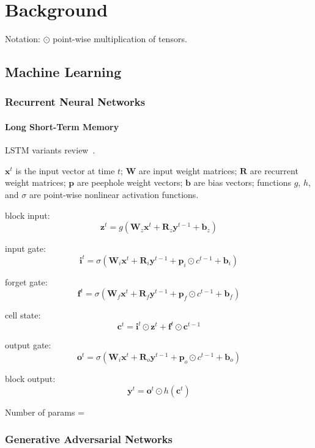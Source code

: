 \chapter{Background}

Notation: $\odot$ point-wise multiplication of tensors.

\section{Machine Learning}

\subsection{Recurrent Neural Networks}

\subsubsection{Long Short-Term Memory}

LSTM variants review~\cite{Greff2015}.

$\bm{x}^t$ is the input vector at time $t$; $\bm{W}$ are input weight matrices; $\bm{R}$ are recurrent weight matrices; $\bm{p}$ are peephole weight vectors; $\bm{b}$ are bias vectors; functions $g$, $h$, and $\sigma$ are point-wise nonlinear activation functions.

block input:
\[ \bm{z}^{t} = g \left( \bm{W}_z \bm{x}^t + \bm{R}_z \bm{y}^{t - 1} + \bm{b}_z \right) \]

input gate:
\[ \bm{i}^{t} = \sigma \left( \bm{W}_i \bm{x}^t + \bm{R}_i \bm{y}^{t-1} + \bm{p}_i \odot c^{t-1} + \bm{b}_i \right) \]

forget gate:
\[ \bm{f}^{t} = \sigma \left( \bm{W}_f \bm{x}^t + \bm{R}_f \bm{y}^{t-1} + \bm{p}_f \odot c^{t-1} + \bm{b}_f \right) \]

cell state:
\[ \bm{c}^t = \bm{i}^t \odot \bm{z}^t + \bm{f}^t \odot \bm{c}^{t-1} \]

output gate:
\[ \bm{o}^{t} = \sigma \left( \bm{W}_i \bm{x}^t + \bm{R}_o \bm{y}^{t - 1} + \bm{p}_o \odot c^{t-1} + \bm{b}_o \right) \]

block output:
\[ \bm{y}^t = \bm{o}^t \odot h(\bm{c}^t) \]

Number of params = \todo{\ldots}


\subsection{Generative Adversarial Networks}

